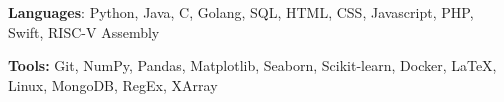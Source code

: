 \documentclass{article}
\begin{document}
    


    \begin{adjustwidth}{1em}{1em}
        
        \textbf{Languages}: Python, Java, C, Golang, SQL, HTML, CSS, Javascript, PHP, Swift, RISC-V Assembly
    
        \vspace{1mm}

        \textbf{Tools:} Git, NumPy, Pandas, Matplotlib, Seaborn, Scikit-learn, Docker, \LaTeX, Linux, MongoDB, RegEx, XArray

    \end{adjustwidth}

    
\end{document}
